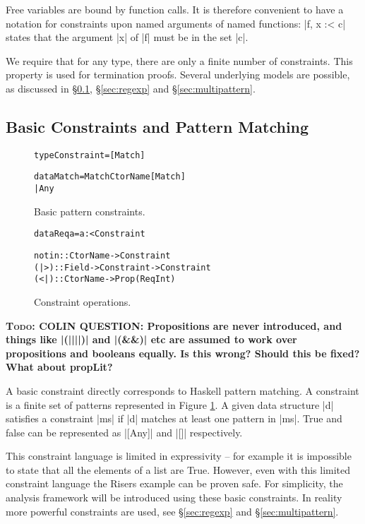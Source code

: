 \documentclass[preprint]{sigplanconf}
\newcommand{\C}[1]{\textsf{#1}}
\newcommand{\todo}[1]{\textbf{\textsc{Todo:} #1}}
\newenvironment{code}{\begin{alltt}\small}{\end{alltt}}
\begin{document}
Free variables are bound by function calls. It is therefore convenient to have a notation for constraints upon named arguments of named functions: |f, x :< c| states that the argument |x| of |f| must be in the set |c|.

We require that for any type, there are only a finite number of constraints. This property is used for termination proofs. Several underlying models are possible, as discussed in \S\ref{sec:basic}, \S\ref{sec:regexp} and \S\ref{sec:multipattern}.


\subsection{Basic Constraints and Pattern Matching}
\label{sec:basic}

\begin{figure}
\begin{code}
type Constraint = [Match]

data Match  =  Match CtorName [Match]
            |  Any
\end{code}
\caption{Basic pattern constraints.}
\label{fig:basic}
\end{figure}

\begin{figure}
\begin{code}
data Req a = a :< Constraint

notin :: CtorName -> Constraint
(|>) :: Field -> Constraint -> Constraint
(<|) :: CtorName -> Prop (Req Int)
\end{code}
\caption{Constraint operations.}
\label{fig:constraint}
\end{figure}

\todo{COLIN QUESTION: Propositions are never introduced, and things like |(||||)| and |(&&)| etc are assumed to work over propositions and booleans equally. Is this wrong? Should this be fixed? What about \C{propLit}?}

A basic constraint directly corresponds to Haskell pattern matching. A constraint is a finite set of patterns represented in Figure \ref{fig:basic}. A given data structure |d| satisfies a constraint |ms| if |d| matches at least one pattern in |ms|. True and false can be represented as |[Any]| and |[]| respectively.

This constraint language is limited in expressivity -- for example it is impossible to state that all the elements of a list are True. However, even with this limited constraint language the Risers example can be proven safe. For simplicity, the analysis framework will be introduced using these basic constraints. In  reality more powerful constraints are used, see \S\ref{sec:regexp} and \S\ref{sec:multipattern}.
\end{document}
